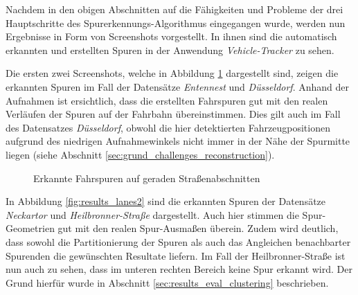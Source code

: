 Nachdem in den obigen Abschnitten auf die Fähigkeiten und Probleme der drei Hauptschritte des
Spurerkennungs-Algorithmus eingegangen wurde, werden nun Ergebnisse in Form von Screenshots vorgestellt.
In ihnen sind die automatisch erkannten und erstellten Spuren in der Anwendung \textit{Vehicle-Tracker} zu sehen.

Die ersten zwei Screenshots, welche in Abbildung \ref{fig:results_lanes1} dargestellt sind, zeigen die erkannten
Spuren im Fall der Datensätze \textit{Entennest} und \textit{Düsseldorf}.
Anhand der Aufnahmen ist ersichtlich, dass die erstellten Fahrspuren gut mit den realen Verläufen der
Spuren auf der Fahrbahn übereinstimmen.
Dies gilt auch im Fall des Datensatzes \textit{Düsseldorf}, obwohl die hier detektierten Fahrzeugpositionen
aufgrund des niedrigen Aufnahmewinkels nicht immer in der Nähe der Spurmitte liegen
(siehe Abschnitt \ref{sec:grund_challenges_reconstruction}).

\begin{figure}[H]
    \centering
    \caption{Erkannte Fahrspuren auf geraden Straßenabschnitten}
    \label{fig:results_lanes1}
\end{figure}

In Abbildung \ref{fig:results_lanes2} sind die erkannten Spuren der Datensätze \textit{Neckartor} und \textit{Heilbronner-Straße}
dargestellt. Auch hier stimmen die Spur-Geometrien gut mit den realen Spur-Ausmaßen überein. Zudem wird deutlich,
dass sowohl die Partitionierung der Spuren als auch das Angleichen benachbarter Spurenden die gewünschten Resultate liefern.
Im Fall der Heilbronner-Straße ist nun auch zu sehen, dass im unteren rechten Bereich keine Spur erkannt wird.
Der Grund hierfür wurde in Abschnitt \ref{sec:results_eval_clustering} beschrieben.


